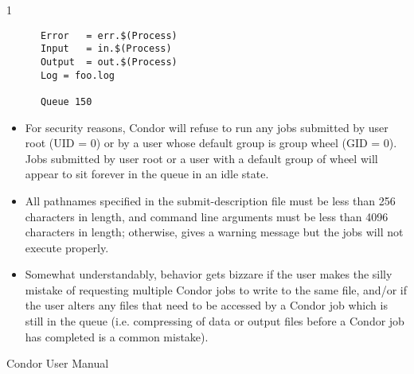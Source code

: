 \begin{ManPage}{\label{man-condor-submit}}{1}
\begin{verbatim}
      Error   = err.$(Process)                                                
      Input   = in.$(Process)                                                 
      Output  = out.$(Process)                                                
      Log = foo.log                                                                       
                                                                          
      Queue 150
\end{verbatim}

\GenRem
\begin{itemize}

\item For security reasons, Condor will refuse to run any jobs submitted
by user root (UID = 0) or by a user whose default group is group wheel
(GID = 0). Jobs submitted by user root or a user with a default group of
wheel will appear to sit forever in the queue in an idle state. 

\item All pathnames specified in the submit-description file must be
less than 256 characters in length, and command line arguments must be
less than 4096 characters in length; otherwise,  gives a
warning message but the jobs will not execute properly. 

\item Somewhat understandably, behavior gets bizzare if the user makes
the silly mistake of requesting multiple Condor jobs to write to the
same file, and/or if the user alters any files that need to be accessed
by a Condor job which is still in the queue (i.e. compressing of data or
output files before a Condor job has completed is a common mistake).
\end{itemize}

\SeeAlso
Condor User Manual

\end{ManPage}

